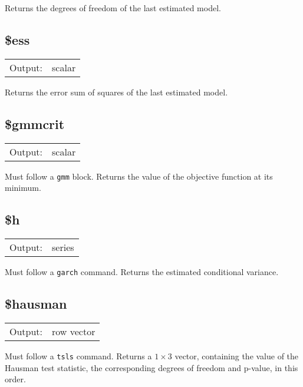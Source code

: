 	  Returns the degrees of freedom of the last estimated model.

\subsection{\$ess}
\hypertarget{func-doless}{}

\begin{tabular}{ll}
Output:     & scalar\\
\end{tabular}

	  Returns the error sum of squares of the last estimated model.

\subsection{\$gmmcrit}
\hypertarget{func-dolgmmcrit}{}

\begin{tabular}{ll}
Output:     & scalar\\
\end{tabular}

	  Must follow a \texttt{gmm} block. Returns the value of the
	  objective function at its minimum.

\subsection{\$h}
\hypertarget{func-dolh}{}

\begin{tabular}{ll}
Output:     & series\\
\end{tabular}

	  Must follow a \texttt{garch} command. Returns the estimated
	  conditional variance.

\subsection{\$hausman}
\hypertarget{func-dolhausman}{}

\begin{tabular}{ll}
Output:     & row vector\\
\end{tabular}

	  Must follow a \texttt{tsls} command. Returns a \ensuremath{1\times 3} vector, containing the value of the Hausman test
	  statistic, the corresponding degrees of freedom and p-value,
	  in this order.

